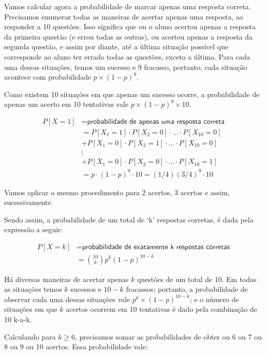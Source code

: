 \documentclass[
]{book}
\theoremstyle{definition}
\theoremstyle{definition}
\theoremstyle{definition}
\theoremstyle{remark}
\begin{document}
Vamos calcular agora a probabilidade de marcar apenas uma resposta correta. Precisamos enumerar todas as maneiras de acertar apenas uma resposta, ao responder a 10 questões. Isso significa que ou o aluno acertou apenas a resposta da primeira questão (e errou todas as outras), ou acertou apenas a resposta da segunda questão, e assim por diante, até a última situação possível que corresponde ao aluno ter errado todas as questões, exceto a última. Para cada uma dessas situações, temos um sucesso e 9 fracasso, portanto, cada situação acontece com probabilidade \(p \times (1-p)^9\).

Como existem 10 situações em que apenas um sucesso ocorre, a probabilidade de apenas um acerto em 10 tentativas vale \(p \times (1-p)^9 \times 10\).

\begin{align*}
P[X=1]   &= \textsf{probabilidade de apenas uma resposta correta}\\
         &= P[X_1 = 1]\cdot P[X_2 = 0]\cdot \ldots \cdot P[X_{10} = 0]\\
         &+ P[X_1 = 0]\cdot P[X_2 = 1]\cdot \ldots \cdot P[X_{10} = 0]\\
         & \vdots\\
         &+ P[X_1 = 0]\cdot P[X_2 = 0]\cdot \ldots \cdot P[X_{10} = 1]\\
         &= p \cdot (1-p)^9 \cdot 10 = (1/4)\left(3/4\right)^{9}\cdot 10
\end{align*}

Vamos aplicar o mesmo procedimento para 2 acertos, 3 acertos e assim, sucessivamente.

Sendo assim, a probabilidade de um total de `k' respostas corretas, é dada pela expressão a seguir:

\begin{align*}
P[X=k] &= \textsf{probabilidade de exatamente k respostas corretas}\\
       &= {\binom{10}{k}}p^k (1-p)^{10-k}
\end{align*}

Há diversas maneiras de acertar apenas \(k\) questões de um total de 10. Em todas as situações temos \(k\) sucessos e \(10-k\) fracassos; portanto, a probabilidade de observar cada uma dessas situações vale \(p^k \times (1-p)^{10-k}\); e o número de situações em que \(k\) acertos ocorrem em 10 tentativas é dado pela combinação de 10 k-a-k.

Calculando para \(k \geq 6\), precisamos somar as probabilidades de obter ou 6 ou 7 ou 8 ou 9 ou 10 acertos. Essa probabilidade vale:
\end{document}
